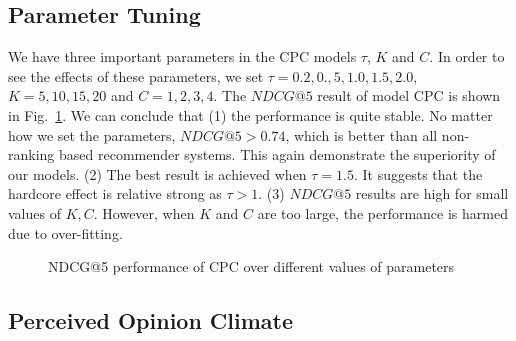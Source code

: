 \documentclass[sigconf]{acmart}
\begin{document}
\subsection{Parameter Tuning}
We have three important parameters in the CPC models $\tau$, $K$ and $C$. In order to see the effects of these parameters, we set $\tau=0.2,0.,5,1.0,1.5,2.0$, $K=5,10,15,20$ and $C=1,2,3,4$. The $NDCG@5$ result of model CPC is shown in Fig.~\ref{fig:parameter}. We can conclude that (1) the performance is quite stable. No matter how we set the parameters,  $NDCG@5>0.74$, which is better than all non-ranking based recommender systems. This again demonstrate the superiority of our models.
(2) The best result is achieved when $\tau=1.5$. It suggests that the hardcore effect is relative strong as $\tau>1$.  (3) $NDCG@5$ results are high for small values of $K,C$. However, when $K$ and $C$ are too large, the performance is harmed due to over-fitting.

\begin{figure}[htbp]
\centering
{}
\caption{NDCG@5 performance of CPC over different values of parameters}\label{fig:parameter}
\end{figure}

\subsection{Perceived Opinion Climate}
\end{document}
